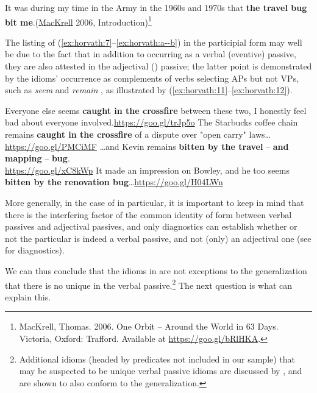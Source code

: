 \documentclass[output=paper,
modfonts
]{LSP/langsci}
\begin{document}
\ex \label{ex:horvath:10} It was during my time in the Army in the 1960s and 1970s that \textbf{the travel bug bit me}.\hfill (\href{https://books.google.co.il/books?isbn=1412078369}{MacKrell} 2006,
Introduction)\footnote{MacKrell, Thomas. 2006. One Orbit -- Around the
  World in 63 Days. Victoria, Oxford: Trafford. Available at
  \url{https://goo.gl/bRlHKA}.}
\z

The listing of (\ref{ex:horvath:7}--\ref{ex:horvath:a--b}) in the  participial form may well be due to
the fact that in addition to occurring as a verbal (eventive) passive,
they are also attested in the adjectival () passive; the latter
point is demonstrated by the idioms' occurrence as complements of verbs
selecting APs but not VPs, such as \emph{seem} and \emph{remain} \citep{wasow1977},
as illustrated by (\ref{ex:horvath:11}--\ref{ex:horvath:12}).

\ea \label{ex:horvath:11}
	\ea \label{ex:horvath:11a} Everyone else seems \textbf{caught in the crossfire} between these two, 
	I honestly feel bad about everyone involved.\hfill \url{https://goo.gl/trJp5o}
	\ex \label{ex:horvath:11b} The Starbucks coffee chain remains \textbf{caught in the crossfire}
	of a dispute over "open carry" laws\ldots{}\hfill \url{https://goo.gl/PMCiMF}
	\z
\ex \label{ex:horvath:12}
	\ea \label{ex:horvath:12a} \ldots{}and Kevin remains \textbf{bitten by the travel} -- \textbf{and}
	\textbf{mapping} -- \textbf{bug}.\\
	\hfill \url{https://goo.gl/xC8kWp}
	\ex \label{ex:horvath:12b} It made an impression on Bowley, and he too seems \textbf{bitten by
	the renovation bug}\ldots{}\hfill \url{https://goo.gl/H04LWn}
	\z
\z

More generally, in the case of  in particular, it is important to
keep in mind that there is the interfering factor of the common identity
of form between verbal passives and adjectival passives, and only
diagnostics can establish whether or not the particular  is indeed
a verbal passive, and not (only) an adjectival  one (see \citealt{wasow1977} for diagnostics).

We can thus conclude that the idioms in  are not exceptions to the
generalization that there is no unique  in the verbal
passive.\footnote{Additional idioms (headed by predicates not included
  in our sample) that may be suspected to be unique verbal passive
  idioms are discussed by \citet{horvath2016}, and are shown to
  also conform to the generalization.} The next question is what can
explain this.
\end{document}
